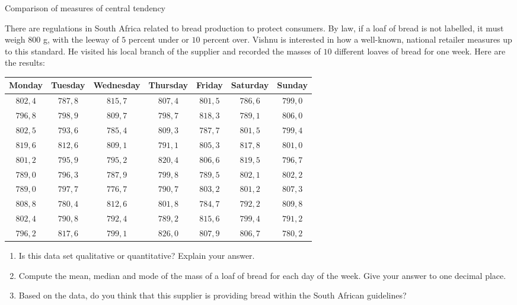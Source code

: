 \begin{wex}{Comparison of measures of central tendency}{
    There are regulations in South Africa related to bread production
    to protect consumers. By law, if a loaf of bread is not labelled,
    it must weigh $800$ g, with the leeway of $5$ percent under or $10$
    percent over.  Vishnu is interested in how a well-known, national
    retailer measures up to this standard. He visited his local branch
    of the supplier and recorded the masses of $10$ different loaves
    of bread for one week. Here are the results:

    \begin{center}
      \begin{tabular}{ccccccc}
        \toprule
        Monday & Tuesday & Wednesday & Thursday & Friday & Saturday & Sunday \\
        \midrule
        $802,4$ & $787,8$ & $815,7$ & $807,4$ & $801,5$ & $786,6$ & $799,0$ \\
        $796,8$ & $798,9$ & $809,7$ & $798,7$ & $818,3$ & $789,1$ & $806,0$ \\
        $802,5$ & $793,6$ & $785,4$ & $809,3$ & $787,7$ & $801,5$ & $799,4$ \\
        $819,6$ & $812,6$ & $809,1$ & $791,1$ & $805,3$ & $817,8$ & $801,0$ \\
        $801,2$ & $795,9$ & $795,2$ & $820,4$ & $806,6$ & $819,5$ & $796,7$ \\
        $789,0$ & $796,3$ & $787,9$ & $799,8$ & $789,5$ & $802,1$ & $802,2$ \\
        $789,0$ & $797,7$ & $776,7$ & $790,7$ & $803,2$ & $801,2$ & $807,3$ \\
        $808,8$ & $780,4$ & $812,6$ & $801,8$ & $784,7$ & $792,2$ & $809,8$ \\
        $802,4$ & $790,8$ & $792,4$ & $789,2$ & $815,6$ & $799,4$ & $791,2$ \\
        $796,2$ & $817,6$ & $799,1$ & $826,0$ & $807,9$ & $806,7$ & $780,2$ \\
        \bottomrule
      \end{tabular}
    \end{center}

    \begin{enumerate}
    \item Is this data set qualitative or quantitative? Explain your
      answer.
    \item Compute the mean, median and mode of the mass of a loaf of bread
      for each day of the week. Give your answer to one decimal place.
    \item Based on the data, do you think that this supplier is
      providing bread within the South African guidelines?
    \end{enumerate}
}{

}
\end{wex}
